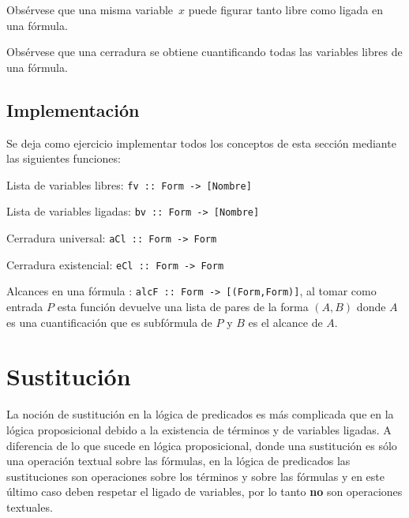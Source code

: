 \documentclass[11pt,letterpaper]{article}
\begin{document}
Obsérvese que una misma variable~$x$ puede figurar tanto libre como ligada en
una fórmula.


Obs\'ervese que una cerradura se obtiene cuantificando todas las variables
libres de una f\'ormula. 


\subsection{Implementación}
\noindent Se deja como ejercicio implementar todos los conceptos de esta 
sección mediante las siguientes funciones:
\bi
\item Lista de variables libres: \verb=fv :: Form -> [Nombre]=
\item Lista de variables ligadas: \verb=bv :: Form -> [Nombre]=
\item Cerradura universal: \verb=aCl :: Form -> Form=
\item Cerradura existencial: \verb=eCl :: Form -> Form=
\item Alcances en una fórmula : \verb=alcF :: Form -> [(Form,Form)]=, al tomar 
como entrada $P$ esta función devuelve una lista de pares de la forma $(A,B)$ 
donde $A$ es una cuantificación que es subfórmula de $P$ y $B$ es el alcance de 
$A$.
\ei


\section{Sustitución}
La noción de sustitución en la lógica de predicados es más complicada que en
la lógica proposicional debido a la existencia de términos y de variables
ligadas. A diferencia de lo que sucede en lógica proposicional, donde una 
sustitución es sólo una operación textual sobre las fórmulas, en la lógica de 
predicados las sustituciones son operaciones sobre los términos y sobre las 
fórmulas y en este último caso deben respetar el ligado de variables, por lo 
tanto \textbf{no} son operaciones textuales.
\end{document}

